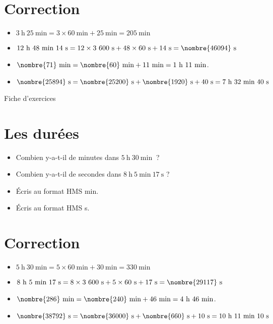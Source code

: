 \documentclass[a4paper,11pt,fleqn]{article}
\begin{document}
\section{Correction}
\begin{itemize}
 \item $3~\text{h}~25~\text{min}=3\times60~\text{min}+25~\text{min}=205~\text{min}$
  \item $12~\text{h}~48~\text{min}~14~\text{s}=12\times3~600~\text{s}+48\times60~\text{s}+14~\text{s}=\nombre{46094}~\text{s}$
  \item $\nombre{71}~\text{min}=\nombre{60}~\text{min}+11~\text{min}=1~\text{h}~11~\text{min}$.
  \item $\nombre{25894}~\text{s}=\nombre{25200}~\text{s}+\nombre{1920}~\text{s}+40~\text{s}=7~\text{h}~32~\text{min}~40~\text{s}$ \end{itemize}


\newpage
\setcounter{exo}{0}
\setcounter{section}{0}
\begin{center}
	{\huge Fiche d'exercices } 	
\end{center}


\section{Les durées}
\begin{itemize}
  \item Combien y-a-t-il de minutes dans $5~\text{h}~30~\text{min}~$ ?
  \item Combien y-a-t-il de secondes dans $8~\text{h}~5~\text{min}~17~\text{s}$ ?
  \item Écris au format HMS  min.
  \item Écris au format HMS  s.
\end{itemize}

\section{Correction}
\begin{itemize}
 \item $5~\text{h}~30~\text{min}=5\times60~\text{min}+30~\text{min}=330~\text{min}$
  \item $8~\text{h}~5~\text{min}~17~\text{s}=8\times3~600~\text{s}+5\times60~\text{s}+17~\text{s}=\nombre{29117}~\text{s}$
  \item $\nombre{286}~\text{min}=\nombre{240}~\text{min}+46~\text{min}=4~\text{h}~46~\text{min}$.
  \item $\nombre{38792}~\text{s}=\nombre{36000}~\text{s}+\nombre{660}~\text{s}+10~\text{s}=10~\text{h}~11~\text{min}~10~\text{s}$ \end{itemize}
\end{document}
